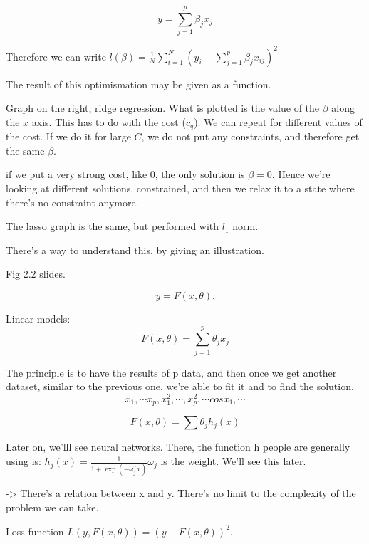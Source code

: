 \documentclass[a4paper]{tufte-book}
\begin{document}
{\begin{equation}
y=\sum_{j=1}^p \beta_j x_j
\end{equation}

Therefore we can write $l(\beta) = \frac{1}{N} \sum_{i=1}^N (y_i - \sum_{j=1}^p \beta_j x_{ij})^2$

The result of this optimismation may be given as a function.

Graph on the right, ridge regression.
What is plotted is the value of the $\beta$ along the $x$ axis. This has to do with the cost ($c_q$). 
We can repeat for different values of the cost.
If we do it for large $C$, we do not put any constraints, and therefore get the same $\beta$.

if we put a very strong cost, like 0, the only solution is $\beta = 0$.
Hence we’re looking at different solutions, constrained, and then we relax it to a state where there’s no constraint anymore.

The lasso graph is the same, but performed with $l_1$ norm.

There’s a way to understand this, by giving an illustration.

Fig 2.2 slides.


\begin{equation}
y=F(x,\theta).
\end{equation}

Linear models:
\begin{equation}
F(x,\theta) = \sum_{j=1}^p \theta_j x_j
\end{equation}

The principle is to have the results of p data, and then once we get another dataset, similar to the previous one, we’re able to fit it and to find the solution.
\begin{equation}
x_1, \cdots x_p, x_1^2, \cdots, x_p^2, \cdots cos x_1, \cdots
\end{equation}

\begin{equation}
F(x, \theta) = \sum \theta_j h_j(x)
\end{equation}

Later on, we’lll see neural networks. There, the function h people are generally using is:
$h_j(x) = \frac{1}{1 + \exp (-\omega_j^T x )} \omega_j$ is the weight. We’ll see this later.

-> There’s a relation between x and y.
There’s no limit to the complexity of the problem we can take.

Loss function $L (y, F(x, \theta)) = (y-F(x,\theta))^2$.

}
\end{document}
